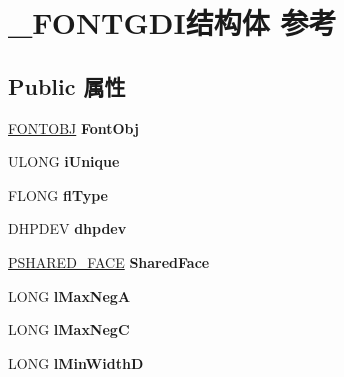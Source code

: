 \hypertarget{struct___f_o_n_t_g_d_i}{}\section{\+\_\+\+F\+O\+N\+T\+G\+D\+I结构体 参考}
\label{struct___f_o_n_t_g_d_i}
\subsection*{Public 属性}
\begin{DoxyCompactItemize}
\item 
\mbox{\label{struct___f_o_n_t_g_d_i_a9cb2b3689c197fff8e35ce88d1dd8a1b}} 
\hyperlink{struct___f_o_n_t_o_b_j}{F\+O\+N\+T\+O\+BJ} {\bfseries Font\+Obj}
\item 
\mbox{\label{struct___f_o_n_t_g_d_i_a81636cc09d4245b8d7b202a1c233bc15}} 
U\+L\+O\+NG {\bfseries i\+Unique}
\item 
\mbox{\label{struct___f_o_n_t_g_d_i_a53c417befdac729fca2ce9a734db9700}} 
F\+L\+O\+NG {\bfseries fl\+Type}
\item 
\mbox{\label{struct___f_o_n_t_g_d_i_a68c9f83fee01a83c01b91a0f3c1c57a5}} 
D\+H\+P\+D\+EV {\bfseries dhpdev}
\item 
\mbox{\label{struct___f_o_n_t_g_d_i_ac043fa0be29ccfdce9c3c3d9a5b25c00}} 
\hyperlink{struct___s_h_a_r_e_d___f_a_c_e}{P\+S\+H\+A\+R\+E\+D\+\_\+\+F\+A\+CE} {\bfseries Shared\+Face}
\item 
\mbox{\label{struct___f_o_n_t_g_d_i_a2e3cf48a10e4c8e2b809954cb81d30de}} 
L\+O\+NG {\bfseries l\+Max\+NegA}
\item 
\mbox{\label{struct___f_o_n_t_g_d_i_a2e45461713e6a540f9ba8861b5b87a1f}} 
L\+O\+NG {\bfseries l\+Max\+NegC}
\item 
\mbox{\label{struct___f_o_n_t_g_d_i_a4e981705d4140cd05cd1bdf42a7c2b0d}} 
L\+O\+NG {\bfseries l\+Min\+WidthD}
\item 
\mbox{\label{struct___f_o_n_t_g_d_i_a12d0571d192e753b2b8410748773bcdd}} 

\end{DoxyCompactItemize}
